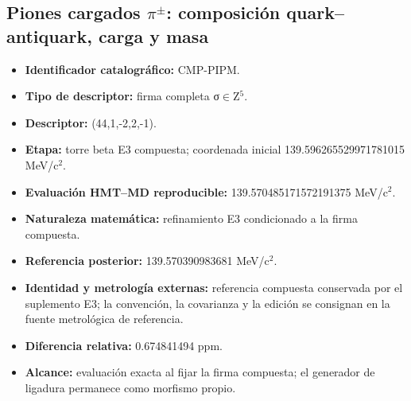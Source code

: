 \subsection{Piones cargados \(\pi^\pm\): composición quark–antiquark, carga y masa}
\begin{itemize}
\item \textbf{Identificador catalográfico:} CMP-PIPM.
\item \textbf{Tipo de descriptor:} firma completa σ\(\in\)Z\({}^{5}\).
\item \textbf{Descriptor:} (44,1,-2,2,-1).
\item \textbf{Etapa:} torre beta E3 compuesta; coordenada inicial 139.596265\allowbreak{}529971\allowbreak{}781015 MeV/c\({}^{2}\).
\item \textbf{Evaluación HMT--MD reproducible:} 139.570485\allowbreak{}171572\allowbreak{}191375 MeV/c\({}^{2}\).
\item \textbf{Naturaleza matemática:} refinamiento E3 condicionado a la firma compuesta.
\item \textbf{Referencia posterior:} 139.570390\allowbreak{}983681 MeV/c\({}^{2}\).
\item \textbf{Identidad y metrología externas:} referencia compuesta conservada por el suplemento E3; la convención, la covarianza y la edición se consignan en la fuente metrológica de referencia.
\item \textbf{Diferencia relativa:} 0.674841\allowbreak{}494 ppm.
\item \textbf{Alcance:} evaluación exacta al fijar la firma compuesta; el generador de ligadura permanece como morfismo propio.
\end{itemize}

